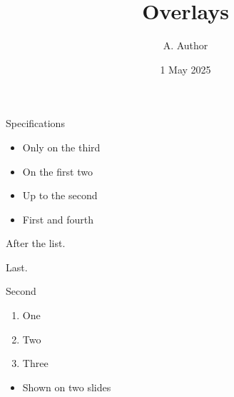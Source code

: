 \documentclass{beamer}
\title{Overlays}
\author{A. Author}
\date{1 May 2025}
\begin{document}
\begin{frame}{Specifications}
\begin{itemize}
\item<3> Only on the third
\item<1-2> On the first two
\item<-2> Up to the second
\item<1,4> First and fourth

\end{itemize}
\pause
After the list.

\pause[4]
Last.
\end{frame}
\begin{frame}{Second}
\begin{enumerate}[<+->]
\item One
\item Two

\item Three
\end{enumerate}
\end{frame}
\begin{frame}
\begin{itemize}
\item<1-2> Shown on two slides
\end{itemize}
\end{frame}
\end{document}
